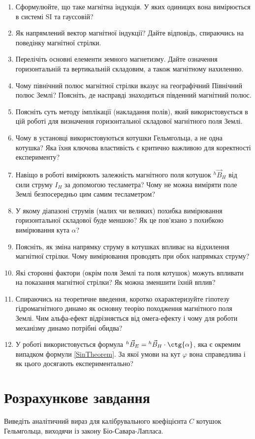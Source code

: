 \begin{enumerate}
    \item Сформулюйте, що таке магнітна індукція. У яких одиницях вона вимірюється в системі SI та гауссовій?
    \item Як напрямлений вектор магнітної індукції? Дайте відповідь, спираючись на поведінку магнітної стрілки.
    \item Перелічіть основні елементи земного магнетизму. Дайте означення горизонтальній та вертикальній складовим, а також магнітному нахиленню.
    \item Чому північний полюс магнітної стрілки вказує на географічний Північний полюс Землі? Поясніть, де насправді знаходиться південний магнітний полюс.
    \item Поясніть суть методу імплікації (накладання полів), який використовується в цій роботі для визначення горизонтальної складової магнітного поля Землі.
    \item Чому в установці використовуються котушки Гельмгольца, а не одна котушка? Яка їхня ключова властивість є критично важливою для коректності експерименту?
    \item Навіщо в роботі вимірюють залежність магнітного поля котушок $ {}^{h}\vec{B}_{H} $ від сили струму $I_H$ за допомогою тесламетра? Чому не можна виміряти поле Землі безпосередньо цим самим тесламетром?
    \item У якому діапазоні струмів (малих чи великих) похибка вимірювання горизонтальної складової буде меншою? Як це пов'язано з похибкою вимірювання кута $\alpha$?
    \item Поясніть, як зміна напрямку струму в котушках впливає на відхилення магнітної стрілки. Чому вимірювання проводять при обох напрямках струму?
    \item Які сторонні фактори (окрім поля Землі та поля котушок) можуть впливати на показання магнітної стрілки? Як можна зменшити їхній вплив?
    \item Спираючись на теоретичне введення, коротко охарактеризуйте гіпотезу гідромагнітного динамо як основну теорію походження магнітного поля Землі. Чим альфа-ефект відрізняється від омега-ефекту і чому для роботи механізму динамо потрібні обидва?
    \item У роботі використовується формула ${}^{h}\vec{B}_{E} = {}^{h}\vec{B}_{H}\cdot\ctg{\alpha}$, яка є окремим випадком формули \eqref{SinTheorem}. За якої умови на кут $\varphi$ вона справедлива і як цього досягають експериментально?
\end{enumerate}

\section*{Розрахункове завдання}

Виведіть аналітичний вираз для калібрувального коефіцієнта $C$ котушок Гельмгольца, виходячи із закону Біо-Савара-Лапласа.